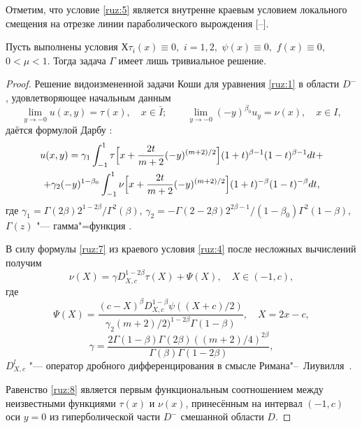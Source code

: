 Отметим, что условие \eqref{ruz:5} является внутренне краевым условием локального
смещения на отрезке линии параболического вырождения [--].


\smallskip


\begin{theorem}[1]Пусть выполнены условия  $Х{\tau _i}(x) \equiv 0,$
$i = 1, 2,$  $\psi (x) \equiv 0,$  ${f(x) \equiv 0,}$  $0 < \mu  < 1.$
Тогда задача \hyperlink{ruz:G}{$\Gamma $}  имеет  лишь тривиальное решение{\rm .}
\end{theorem}

\smallskip

\begin{proof} Решение видоизмененной задачи Коши для
уравнения \eqref{ruz:1} в области $D^{-}$, удовлетворяющее начальным
данным  
$$\lim\limits_{y\to-0}u(x,y)=\tau(x),\quad x\in\bar I;\qquad \lim\limits_{y\to-0}{(-y)^{\beta_0}}u_{y}=\nu(x),\quad  x\in I,$$ даётся формулой Дарбу
\cite[с.~34]{ruz:bib:9}:
\begin{multline}
u(x,y)=\gamma_1\int_{-1}^1{\tau\Bigl[x+\frac{2t}{m + 2}(-y)^{(m+2)/2}\Bigr](1+t)^{\beta-1}(1-t)^{\beta-1}}dt+
\\
+\gamma_2(-y)^{1-\beta_0}\int_{-1}^1{\nu\Bigl[x+\frac{2t}{m+2}(-y)^{(m + 2)/2}\Bigr](1+t)^{-\beta}(1-t)^{-\beta}dt},
\label{ruz:7}
\end{multline}
где
$\gamma_1=\Gamma(2\beta){2^{1-2\beta}}/\Gamma^2(\beta)$,
$\gamma_2=-\Gamma(2-2\beta){2^{2\beta-1}}/(1-\beta_0)\Gamma^2(1-\beta)$,
$\Gamma(z)$ "--- гамма"=функция \cite{ruz:bib:4}.

В силу формулы \eqref{ruz:7}  из краевого условия \eqref{ruz:4} после несложных вычислений получим
\begin{equation}
\nu(X)=\gamma D_{X,c}^{1-2\beta}\tau(X)+\Psi(X), \quad X\in(-1,c),
\label{ruz:8}
\end{equation}
где
$$\Psi(X)=\frac{(c-X)^\beta D_{X,c}^{1-\beta}\psi((X+c)/2)}{\gamma_2(m+2)/2)^{1-2\beta}\Gamma(1-\beta)},\quad X=2x-c,$$ $$\gamma=\frac{2\Gamma(1-\beta)\Gamma(2\beta)((m+2)/4)^{2\beta}}{\Gamma(\beta)\Gamma(1-2\beta)},$$  $D_{X,c}^l$ "--- оператор дробного дифференцирования в смысле Римана"--~Лиувилля~\cite{ruz:bib:5}.

Равенство \eqref{ruz:8} является первым функциональным соотношением между
неизвестными функциями  $\tau (x)$ и $\nu (x)$, принесённым на
интервал $(-1, c)$  оси $y=0$ из  гиперболической части $D^{ - }$
смешанной области $D$.


\end{proof}

